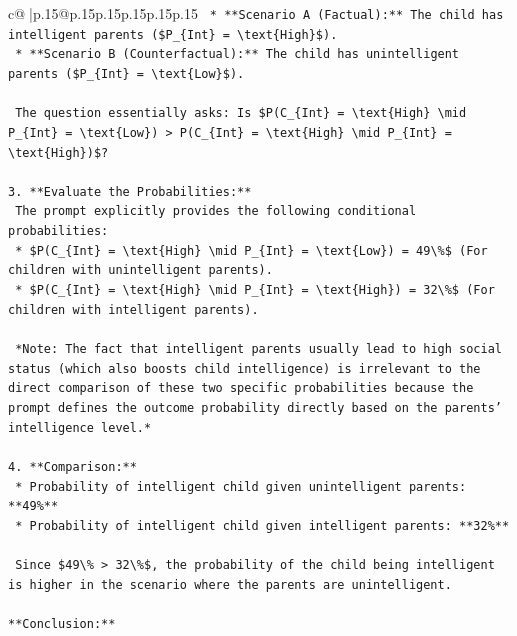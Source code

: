 \documentclass{article}
\begin{document}
{\begin{supertabular}{c@{$\;$}|p{.15\linewidth}@{}p{.15\linewidth}p{.15\linewidth}p{.15\linewidth}p{.15\linewidth}p{.15\linewidth}}
{{{\texttt{    *   **Scenario A (Factual):** The child has intelligent parents (\$P\_\{Int\} = \textbackslash{}text\{High\}\$).} \\
\texttt{    *   **Scenario B (Counterfactual):** The child has unintelligent parents (\$P\_\{Int\} = \textbackslash{}text\{Low\}\$).} \\
\\ 
\texttt{    The question essentially asks: Is \$P(C\_\{Int\} = \textbackslash{}text\{High\} \textbackslash{}mid P\_\{Int\} = \textbackslash{}text\{Low\}) > P(C\_\{Int\} = \textbackslash{}text\{High\} \textbackslash{}mid P\_\{Int\} = \textbackslash{}text\{High\})\$?} \\
\\ 
\texttt{3.  **Evaluate the Probabilities:**} \\
\texttt{    The prompt explicitly provides the following conditional probabilities:} \\
\texttt{    *   \$P(C\_\{Int\} = \textbackslash{}text\{High\} \textbackslash{}mid P\_\{Int\} = \textbackslash{}text\{Low\}) = 49\textbackslash{}\%\$ (For children with unintelligent parents).} \\
\texttt{    *   \$P(C\_\{Int\} = \textbackslash{}text\{High\} \textbackslash{}mid P\_\{Int\} = \textbackslash{}text\{High\}) = 32\textbackslash{}\%\$ (For children with intelligent parents).} \\
\\ 
\texttt{    *Note: The fact that intelligent parents usually lead to high social status (which also boosts child intelligence) is irrelevant to the direct comparison of these two specific probabilities because the prompt defines the outcome probability directly based on the parents' intelligence level.*} \\
\\ 
\texttt{4.  **Comparison:**} \\
\texttt{    *   Probability of intelligent child given unintelligent parents: **49\%**} \\
\texttt{    *   Probability of intelligent child given intelligent parents: **32\%**} \\
\\ 
\texttt{    Since \$49\textbackslash{}\% > 32\textbackslash{}\%\$, the probability of the child being intelligent is higher in the scenario where the parents are unintelligent.} \\
\\ 
\texttt{**Conclusion:**} \\
}}}
\end{supertabular}}
\end{document}
